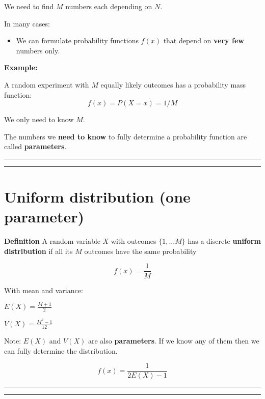 \documentclass[
]{book}
\providecommand{\tightlist}{%
  \setlength{\itemsep}{0pt}\setlength{\parskip}{0pt}}
\begin{document}
We need to find \(M\) numbers each depending on \(N\).

In many cases:

\begin{itemize}
\tightlist
\item
  We can formulate probability functions \(f(x)\) that depend on \textbf{very few} numbers only.
\end{itemize}

\textbf{Example:}

A random experiment with \(M\) equally likely outcomes has a probability mass function:
\[f(x)=P(X=x)=1/M\]

We only need to know \(M\).

The numbers we \textbf{need to know} to fully determine a probability function are called \textbf{parameters}.

\begin{center}\rule{0.5\linewidth}{0.5pt}\end{center}

\begin{center}\rule{0.5\linewidth}{0.5pt}\end{center}

\hypertarget{uniform-distribution-one-parameter}{%
\section{Uniform distribution (one parameter)}\label{uniform-distribution-one-parameter}}

\textbf{Definition}
A random variable \(X\) with outcomes \(\{1,...M\}\) has a discrete \textbf{uniform distribution} if all its \(M\) outcomes have the same probability

\[f(x)=\frac{1}{M}\]

With mean and variance:

\(E(X)= \frac{M+1}{2}\)

\(V(X)= \frac{M^2-1}{12}\)

Note: \(E(X)\) and \(V(X)\) are also \textbf{parameters}. If we know any of them then we can fully determine the distribution.

\[f(x)=\frac{1}{2E(X)-1}\]

\begin{center}\rule{0.5\linewidth}{0.5pt}\end{center}

\begin{center}\rule{0.5\linewidth}{0.5pt}\end{center}
\end{document}
